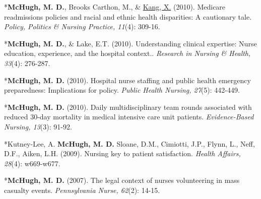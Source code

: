 \documentclass[10pt,]{article}
\begin{document}
{{{{{{{{{{{{{{{\begin{hangparas}{.25in}{1}
*{\textbf {McHugh, M. D.}}, Brooks Carthon, M., \& {\underline {Kang, X.}} (2010). Medicare readmissions policies and racial and ethnic health disparities: A cautionary tale. {\textit {Policy, Politics \& Nursing Practice, 11}}(4): 309-16.

\end{hangparas}



\begin{hangparas}{.25in}{1}

*{\textbf {McHugh, M. D.}}, \& Lake, E.T. (2010). Understanding clinical expertise: Nurse education, experience, and the hospital context.. {\textit {Research in Nursing \& Health, 33}}(4): 276-287.

\end{hangparas}



\begin{hangparas}{.25in}{1}

*{\textbf {McHugh, M. D.}} (2010). Hospital nurse staffing and public health emergency preparedness: Implications for policy. {\textit {Public Health Nursing, 27}}(5): 442-449.

\end{hangparas}



\begin{hangparas}{.25in}{1}

*{\textbf {McHugh, M. D.}} (2010). Daily multidisciplinary team rounds associated with reduced 30-day mortality in medical intensive care unit patients. {\textit {Evidence-Based Nursing, 13}}(3): 91-92.

\end{hangparas}



\begin{hangparas}{.25in}{1}

*Kutney-Lee, A. {\textbf {McHugh, M. D.}} Sloane, D.M., Cimiotti, J.P., Flynn, L., Neff, D.F., Aiken, L.H. (2009). Nursing key to patient satisfaction. {\textit {Health Affairs, 28}}(4): w669-w677.

\end{hangparas}



\begin{hangparas}{.25in}{1}

*{\textbf {McHugh, M. D.}} (2007). The legal context of nurses volunteering in mass casualty events. {\textit {Pennsylvania Nurse, 62}}(2): 14-15.


\end{hangparas}}}}}}}}}}}}}}}}
\end{document}
